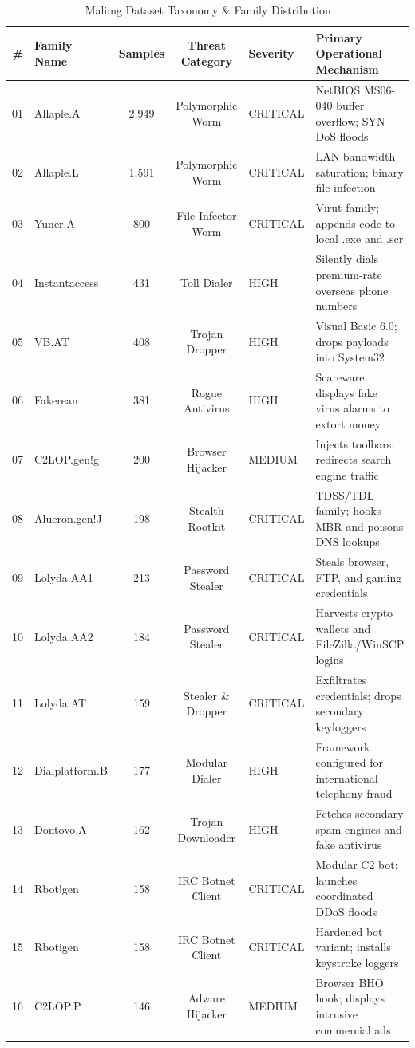 \documentclass[journal,10pt,twocolumn]{IEEEtran}
\begin{document}
\begin{table}[!t]
\caption{Malimg Dataset Taxonomy \& Family Distribution\label{tab:malimg}}
\centering
\begin{tabular}{rlccll}
\toprule
\textbf{\#} & \textbf{Family Name} & \textbf{Samples} & \textbf{Threat Category} & \textbf{Severity} & \textbf{Primary Operational Mechanism} \\
\midrule
01 & Allaple.A & 2,949 & Polymorphic Worm & CRITICAL & NetBIOS MS06-040 buffer overflow; SYN DoS floods \\
02 & Allaple.L & 1,591 & Polymorphic Worm & CRITICAL & LAN bandwidth saturation; binary file infection \\
03 & Yuner.A & 800 & File-Infector Worm & CRITICAL & Virut family; appends code to local .exe and .scr \\
04 & Instantaccess & 431 & Toll Dialer & HIGH & Silently dials premium-rate overseas phone numbers \\
05 & VB.AT & 408 & Trojan Dropper & HIGH & Visual Basic 6.0; drops payloads into System32 \\
06 & Fakerean & 381 & Rogue Antivirus & HIGH & Scareware; displays fake virus alarms to extort money \\
07 & C2LOP.gen!g & 200 & Browser Hijacker & MEDIUM & Injects toolbars; redirects search engine traffic \\
08 & Alueron.gen!J & 198 & Stealth Rootkit & CRITICAL & TDSS/TDL family; hooks MBR and poisons DNS lookups \\
09 & Lolyda.AA1 & 213 & Password Stealer & CRITICAL & Steals browser, FTP, and gaming credentials \\
10 & Lolyda.AA2 & 184 & Password Stealer & CRITICAL & Harvests crypto wallets and FileZilla/WinSCP logins \\
11 & Lolyda.AT & 159 & Stealer \& Dropper & CRITICAL & Exfiltrates credentials; drops secondary keyloggers \\
12 & Dialplatform.B & 177 & Modular Dialer & HIGH & Framework configured for international telephony fraud \\
13 & Dontovo.A & 162 & Trojan Downloader & HIGH & Fetches secondary spam engines and fake antivirus \\
14 & Rbot!gen & 158 & IRC Botnet Client & CRITICAL & Modular C2 bot; launches coordinated DDoS floods \\
15 & Rbotigen & 158 & IRC Botnet Client & CRITICAL & Hardened bot variant; installs keystroke loggers \\
16 & C2LOP.P & 146 & Adware Hijacker & MEDIUM & Browser BHO hook; displays intrusive commercial ads \\

\end{tabular}
\end{table}
\end{document}
